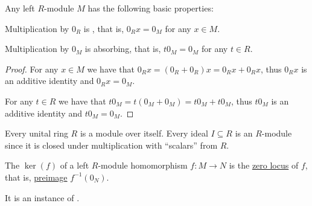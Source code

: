 \begin{proposition}\label{thm:def:left_module/properties}
  Any left \( R \)-module \( M \) has the following basic properties:
  \begin{thmenum}
     Multiplication by \( 0_R \) is , that is, \( 0_R x = 0_M \) for any \( x \in M \).

     Multiplication by \( 0_M \) is absorbing, that is, \( t 0_M = 0_M \) for any \( t \in R \).
  \end{thmenum}
\end{proposition}
\begin{proof}
   For any \( x \in M \) we have that \( 0_R x = (0_R + 0_R)x = 0_R x + 0_R x \), thus \( 0_R x \) is an additive identity and \( 0_R x = 0_M \).

   For any \( t \in R \) we have that \( t 0_M = t (0_M + 0_M) = t 0_M + t 0_M \), thus \( t 0_M \) is an additive identity and \( t 0_M = 0_M \).
\end{proof}

\begin{example}\label{ex:module/ideal_of_ring}
  Every unital ring \( R \) is a module over itself. Every ideal \( I \subseteq R \) is an \( R \)-module since it is closed under multiplication with \enquote{scalars} from \( R \).
\end{example}

\begin{definition}\label{def:left_module_kernel}
  The  \( \ker(f) \) of a left \( R \)-module homomorphism \( f: M \to N \) is the \hyperref[def:zero_locus]{zero locus} of \( f \), that is, \hyperref[thm:def:function/properties/preimage]{preimage} \( f^{-1}(0_N) \).

  It is an instance of .
\end{definition}

